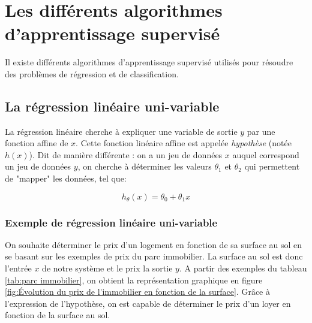 \section{Les différents algorithmes d'apprentissage supervisé}
\label{Le Machine Learning:Les différents algorithmes d'apprentissage supervisé}
Il existe différents algorithmes d'apprentissage supervisé utilisés pour résoudre des problèmes de régression et de classification. 


\subsection{La régression linéaire uni-variable}
\label{Le Machine Learning:Les différents algorithmes d'apprentissage supervisé: La regression linéaire}
La régression linéaire cherche à expliquer une variable de sortie $y$ par une fonction affine de $x$. Cette fonction linéaire affine est appelée \emph{hypothèse} (notée $h(x)$). Dit de manière différente : on a un jeu de données $x$ auquel correspond un jeu de données $y$, on cherche à déterminer les valeurs $\theta_1$ et $\theta_2$ qui permettent de "mapper" les données, tel que:

\begin{equation}
	h_\theta (x) = \theta_0 + \theta_1 x
\end{equation}


\subsubsection{Exemple de régression linéaire uni-variable}
\label{Le Machine Learning:Les différents algorithmes d'apprentissage supervisé: La regression linéaire: Exemple de régression linéaire uni-variable}
On souhaite déterminer le prix d'un logement en fonction de sa surface au sol en se basant sur les exemples de prix du parc immobilier. 
La surface au sol est donc l'entrée $x$ de notre système et le prix la sortie $y$. A partir des exemples du tableau \ref {tab:parc immobilier}, on obtient la représentation graphique en figure \ref{fig:Évolution du prix de l'immobilier en fonction de la surface}. Grâce à l'expression de l'hypothèse, on est capable de déterminer le prix d'un loyer en fonction de la surface au sol.  

